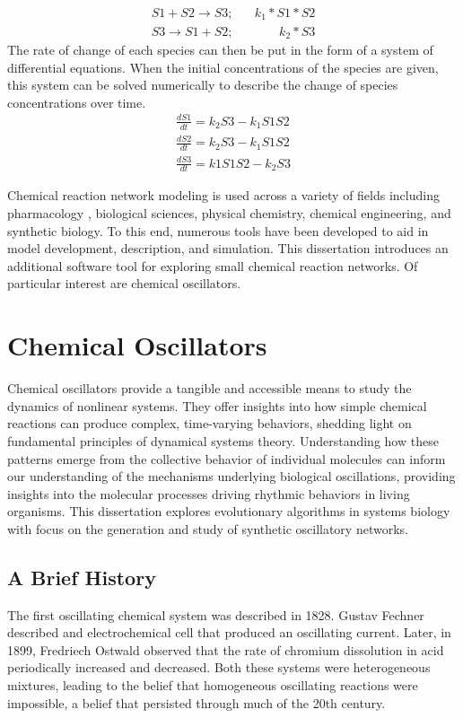 \documentclass[12pt]{report}
\begin{document}
\begin{equation}
\begin{split}
S1 + S2 \to S3; \;\;\;\;\;\; k_1*S1*S2\\
S3 \to S1 + S2; \;\;\;\;\;\;\;\;\;\;\;\;\; k_2*S3
\end{split}
\end{equation}
The rate of change of each species can then be put in the form of a system of differential equations. When the initial concentrations of the species are given, this system can be solved numerically to describe the change of species concentrations over time.
\begin{equation}
\begin{split}
\frac{dS1}{dt}=k_2S3 - k_1S1S2\\
\frac{dS2}{dt}=k_2S3 -k_1S1S2\\
\frac{dS3}{dt}=k1S1S2 - k_2S3
\end{split}
\end{equation}

Chemical reaction network modeling is used across a variety of fields including pharmacology \cite{Zou2020}, biological sciences\cite{Liu2020}, physical chemistry, chemical engineering, and synthetic biology. To this end, numerous tools have been developed to aid in model development, description, and simulation. This dissertation introduces an additional software tool for exploring small chemical reaction networks. Of particular interest are chemical oscillators.


\section{Chemical Oscillators}
\label{section:intro_oscillators}

Chemical oscillators provide a tangible and accessible means to study the dynamics of nonlinear systems. They offer insights into how simple chemical reactions can produce complex, time-varying behaviors, shedding light on fundamental principles of dynamical systems theory. Understanding how these patterns emerge from the collective behavior of individual molecules can inform our understanding of the mechanisms underlying biological oscillations, providing insights into the molecular processes driving rhythmic behaviors in living organisms. This dissertation explores evolutionary algorithms in systems biology with focus on the generation and study of synthetic oscillatory networks.

\subsection{A Brief History}
The first oscillating chemical system was described in 1828. Gustav Fechner described and electrochemical cell that produced an oscillating current. Later, in 1899, Fredriech Ostwald observed that the rate of chromium dissolution in acid periodically increased and decreased. Both these systems were heterogeneous mixtures, leading to the belief that homogeneous oscillating reactions were impossible, a belief that persisted through much of the 20th century. 
\end{document}

